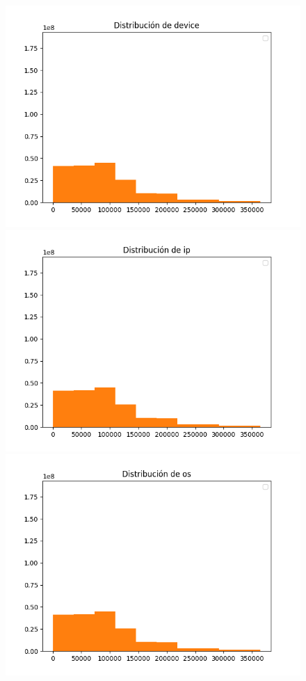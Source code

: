 \begin{figure}
\includegraphics[scale=0.5]{img/device_distribution.png}
\includegraphics[scale=0.5]{img/ip_distribution.png}
\includegraphics[scale=0.5]{img/os_distribution.png}	
\end{figure}

